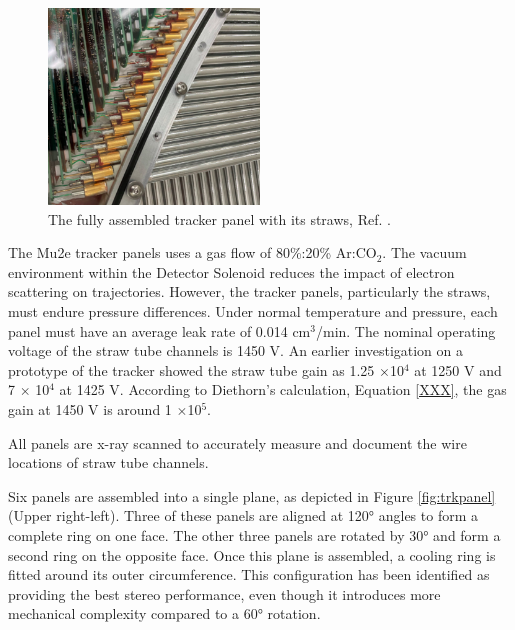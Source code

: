        \begin{figure}[!h]
            \centering
            \includegraphics[width =0.5\textwidth]{figures/png/Screenshot_20240327_000131.png}
            \caption{The fully assembled tracker panel with its straws, Ref. \cite{trk}.}
            \label{fig:strawtubes}
            \end{figure}
            
            The Mu2e tracker panels uses a gas flow of 80\%:20\% Ar:CO$_2$. 
            The vacuum environment within the Detector Solenoid reduces the impact of electron 
            scattering on trajectories. 
            However, the tracker panels, particularly the straws, must endure pressure 
            differences. Under normal temperature 
            and pressure, each panel must have an average leak rate of 
            0.014 cm$^3$/min. The nominal operating voltage of 
            the straw tube channels is 1450 V. An earlier investigation 
            on a prototype of the tracker showed the straw tube 
            gain as 1.25 $\times$10$^4$ at 1250 V and 7 $\times$ 10$^4$ at 
            1425 V. According to Diethorn's calculation, Equation \ref{XXX}, 
            the gas gain at 1450 V is around 1 $\times$10$^5$.

All panels are x-ray scanned 
to accurately measure and document the wire 
locations of straw tube channels. 


Six panels are assembled into a single plane, as depicted in Figure \ref{fig:trkpanel} 
(Upper right-left). Three of these panels are aligned at 120° angles 
to form a complete ring on one face. The other three panels are rotated by 
30° and form a second ring on the opposite face. Once 
this plane is assembled, a cooling ring is fitted around its outer circumference. 
This configuration has been identified as providing the best stereo performance, 
even though it introduces more mechanical complexity compared to a 60° rotation.

